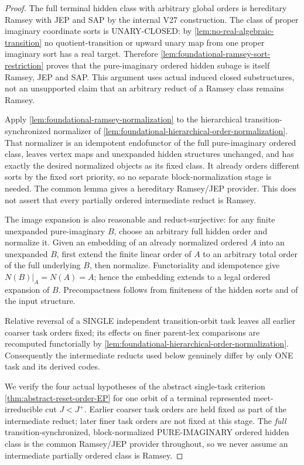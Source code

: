 \begin{proof}
The full terminal hidden class with arbitrary
global orders is hereditary Ramsey with JEP
and SAP by the internal V27 construction.
The class of proper imaginary coordinate
sorts is UNARY-CLOSED: by
\cref{lem:no-real-algebraic-transition}
no quotient-transition or upward unary map
from one proper imaginary sort has a real
target. Therefore
\cref{lem:foundational-ramsey-sort-restriction}
proves that the pure-imaginary ordered hidden
subage is itself Ramsey, JEP and SAP.
This argument uses actual induced closed
substructures, not an unsupported claim
that an arbitrary reduct of a Ramsey
class remains Ramsey.

Apply \cref{lem:foundational-ramsey-normalization} to the hierarchical
transition-synchronized normalizer of
\cref{lem:foundational-hierarchical-order-normalization}.
That normalizer is an idempotent endofunctor of the full
pure-imaginary ordered class, leaves vertex maps and unexpanded
hidden structures unchanged, and has exactly the desired normalized
objects as its fixed class. It already orders different sorts by the
fixed sort priority, so no separate block-normalization stage is needed.
The common lemma gives a hereditary Ramsey/JEP provider. This does not
assert that every partially ordered intermediate reduct is Ramsey.

The image expansion is also reasonable
and reduct-surjective: for any finite
unexpanded pure-imaginary \(B\), choose
an arbitrary full hidden order and
normalize it. Given an embedding of
an already normalized ordered \(A\)
into an unexpanded \(B\), first extend
the finite linear order of \(A\) to
an arbitrary total order of the full
underlying \(B\), then normalize.
Functoriality and idempotence give
\(N(B)|_A=N(A)=A\); hence the embedding
extends to a legal ordered expansion
of \(B\). Precompactness follows
from finiteness of the hidden sorts
and of the input structure.

Relative reversal of a SINGLE independent
transition-orbit task leaves all earlier
coarser task orders fixed; its effects
on finer parent-lex comparisons are
recomputed functorially by
\cref{lem:foundational-hierarchical-order-normalization}.
Consequently the intermediate reducts
used below genuinely differ by only
ONE task and its derived codes.

We verify the four actual hypotheses of the
abstract single-task criterion
\cref{thm:abstract-reset-order-EP}
for one orbit of a terminal represented
meet-irreducible cut $J<J^+$.
Earlier coarser task orders are held fixed as
part of the intermediate reduct; later finer
task orders are not fixed at this stage.
The \emph{full} transition-synchronized,
block-normalized PURE-IMAGINARY ordered
hidden class is the common Ramsey/JEP
provider throughout, so we never assume
an intermediate partially ordered class
is Ramsey.


\end{proof}
